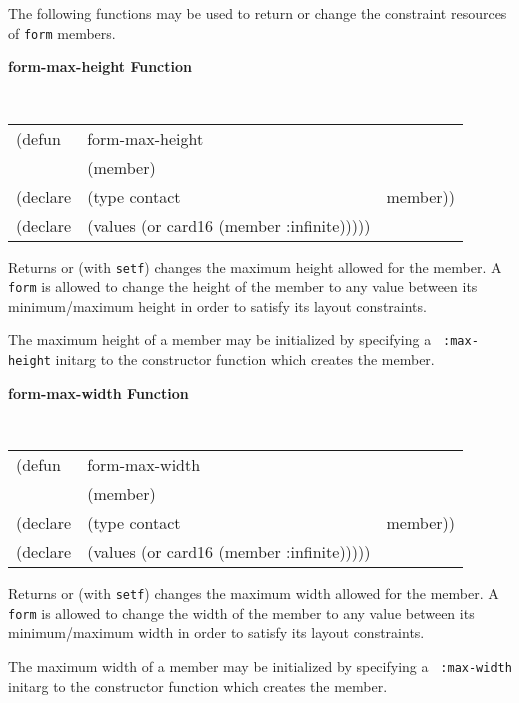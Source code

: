 The
following functions may be used to return or change
the constraint resources of {\tt form} members.


{\samepage  
{\large {\bf form-max-height \hfill Function}}
\begin{flushright} \parbox[t]{6.125in}{
\tt
\begin{tabular}{lll}
\raggedright
(defun & form-max-height & \\
& (member) \\
(declare &(type contact & member))\\
(declare & (values (or card16 (member :infinite)))))
\end{tabular}
\rm

}\end{flushright}}



\begin{flushright} \parbox[t]{6.125in}{
Returns or (with {\tt setf}) changes the maximum
            height allowed for the member.  A {\tt form} is allowed to change the
            height of the member to any value between its minimum/maximum height
in order to satisfy
            its layout constraints.

The maximum height of a member may be initialized by specifying a {\tt
:max-height} initarg to the constructor function which creates the member.
 
}
\end{flushright}



 

{\samepage  
{\large {\bf form-max-width \hfill Function}}
\begin{flushright} \parbox[t]{6.125in}{
\tt
\begin{tabular}{lll}
\raggedright
(defun & form-max-width & \\
& (member) \\
(declare &(type contact & member))\\
(declare & (values (or card16 (member :infinite)))))
\end{tabular}
\rm

}\end{flushright}}



\begin{flushright} \parbox[t]{6.125in}{
Returns or (with {\tt setf}) changes the maximum
            width allowed for the member.  A {\tt form} is allowed to change the
            width of the member to any value between its minimum/maximum width
in order to satisfy
            its layout constraints.

The maximum width of a member may be initialized by specifying a {\tt
:max-width} initarg to the constructor function which creates the member.
}
\end{flushright}



